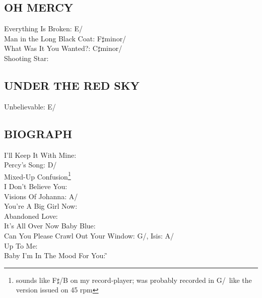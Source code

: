 \begin{articlelayout}
\subsection{OH MERCY}
Everything Is Broken: E/\A\\ Man in the Long Black Coat: F$\sharp$minor/\A\\ What Was It You Wanted?: C$\sharp$minor/\E\\ Shooting Star: \E


\subsection{UNDER THE RED SKY}
Unbelievable: E/\A


\subsection{BIOGRAPH}
I'll Keep It With Mine: \C\\ Percy's Song: D/\G\\ Mixed-Up Confusion\footnote{sounds like F$\sharp$/B on my
record-player; was probably recorded in G/\C\ like the version issued
on 45 rpm}\\ I Don't Believe You: \E\\ Visions Of Johanna: A/\D\\ You're A Big Girl Now: \E\\ Abandoned Love: \G\\ It's All Over Now Baby Blue: \D\\ Can You Please Crawl Out Your Window: G/\C,
Isis: A/\D\\ Up To Me: \E\\ Baby I'm In The Mood For You: \G



\end{articlelayout}
